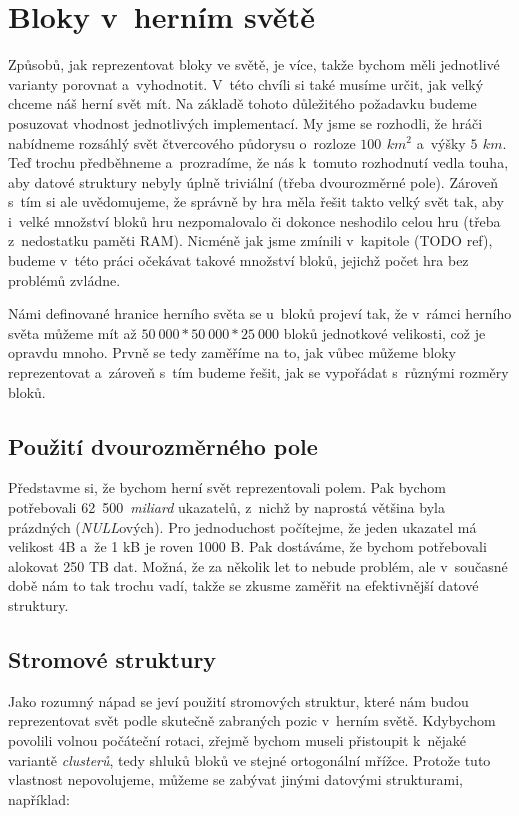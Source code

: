 
\section{Bloky v~herním světě}
\label{sec:blocksWorld}

Způsobů, jak reprezentovat bloky ve světě, je více, takže bychom měli jednotlivé varianty porovnat a~vyhodnotit. V~této chvíli si také musíme určit, jak velký chceme náš herní svět mít. Na základě tohoto důležitého požadavku budeme posuzovat vhodnost jednotlivých implementací. My jsme se rozhodli, že hráči nabídneme rozsáhlý svět čtvercového půdorysu o~rozloze $100\,\ km^2$ a~výšky $5\,\ km$. Teď trochu předběhneme a~prozradíme, že nás k~tomuto rozhodnutí vedla touha, aby datové struktury nebyly úplně triviální (třeba dvourozměrné pole). Zároveň s~tím si ale uvědomujeme, že správně by hra měla řešit takto velký svět tak, aby i~velké množství bloků hru nezpomalovalo či dokonce neshodilo celou hru (třeba z~nedostatku paměti RAM). Nicméně jak jsme zmínili v~kapitole (TODO ref), budeme v~této práci očekávat takové množství bloků, jejichž počet hra bez problémů zvládne.

Námi definované hranice herního světa se u~bloků projeví tak, že v~rámci herního světa můžeme mít až  $50~000 * 50~000 * 25~000$ bloků jednotkové velikosti, což je opravdu mnoho. Prvně se tedy zaměříme na to, jak vůbec můžeme bloky reprezentovat a~zároveň s~tím budeme řešit, jak se vypořádat s~různými rozměry bloků.

\subsection{Použití dvourozměrného pole}

Představme si, že bychom herní svět reprezentovali polem. Pak bychom potřebovali 62~500~\textit{miliard} ukazatelů, z~nichž by naprostá většina byla prázdných (\textit{NULL}ových). Pro jednoduchost počítejme, že jeden ukazatel má velikost 4B a~že 1 kB je roven 1000 B. Pak dostáváme, že bychom potřebovali alokovat 250 TB dat. Možná, že za několik let to nebude problém, ale v~současné době nám to tak trochu vadí, takže se zkusme zaměřit na efektivnější datové struktury.

\subsection{Stromové struktury}

Jako rozumný nápad se jeví použití stromových struktur, které nám budou reprezentovat svět podle skutečně zabraných pozic v~herním světě. Kdybychom povolili volnou počáteční rotaci, zřejmě bychom museli přistoupit k~nějaké variantě \textit{clusterů}, tedy shluků bloků ve stejné ortogonální mřížce. Protože tuto vlastnost nepovolujeme, můžeme se zabývat jinými datovými strukturami, například:

